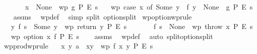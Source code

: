 \begin{isabellebody}
\ \ \ \ \ \ \ {\isachardoublequoteopen}x\ {\isacharequal}{\kern0pt}\ None\ {\isasymLongrightarrow}\ wp\ g\ P\ E\ s{\isachardoublequoteclose}\isanewline
\ \ \ {\isachardoublequoteopen}wp\ {\isacharparenleft}{\kern0pt}case\ x\ of\ Some\ y\ {\isasymRightarrow}\ f\ y\ {\isacharbar}{\kern0pt}\ None\ {\isasymRightarrow}\ g{\isacharparenright}{\kern0pt}\ P\ E\ s{\isachardoublequoteclose}\isanewline
%
\isadelimproof
\ \ %
\endisadelimproof
%
\isatagproof
{}\isamarkupfalse%
\ assms\ \isamarkupfalse%
\ wp{\isacharunderscore}{\kern0pt}def\ \isamarkupfalse%
\ {\isacharparenleft}{\kern0pt}simp\ split{\isacharcolon}{\kern0pt}\ option{\isachardot}{\kern0pt}split{\isacharparenright}{\kern0pt}%
\endisatagproof
{\isafoldproof}%
%
\isadelimproof
\isanewline
%
\endisadelimproof
\isanewline
{}\isamarkupfalse%
\ wpoption{\isacharbrackleft}{\kern0pt}wprule{\isacharbrackright}{\kern0pt}{\isacharcolon}{\kern0pt}\isanewline
\ \ \ {\isachardoublequoteopen}{\isasymAnd}y{\isachardot}{\kern0pt}\ f\ s\ {\isacharequal}{\kern0pt}\ Some\ y\ {\isasymLongrightarrow}\ wp\ {\isacharparenleft}{\kern0pt}return\ y{\isacharparenright}{\kern0pt}\ P\ E\ s{\isachardoublequoteclose}\isanewline
\ \ \ \ \ \ \ {\isachardoublequoteopen}f\ s\ {\isacharequal}{\kern0pt}\ None\ {\isasymLongrightarrow}\ wp\ {\isacharparenleft}{\kern0pt}throw\ x{\isacharparenright}{\kern0pt}\ P\ E\ s{\isachardoublequoteclose}\isanewline
\ \ \ {\isachardoublequoteopen}wp\ {\isacharparenleft}{\kern0pt}option\ x\ f{\isacharparenright}{\kern0pt}\ P\ E\ s{\isachardoublequoteclose}\isanewline
%
\isadelimproof
\ \ %
\endisadelimproof
%
\isatagproof
{}\isamarkupfalse%
\ assms\ \isamarkupfalse%
\ wp{\isacharunderscore}{\kern0pt}def\ \isamarkupfalse%
\ {\isacharparenleft}{\kern0pt}auto\ split{\isacharcolon}{\kern0pt}option{\isachardot}{\kern0pt}split{\isacharparenright}{\kern0pt}%
\endisatagproof
{\isafoldproof}%
%
\isadelimproof
\isanewline
%
\endisadelimproof
\isanewline
{}\isamarkupfalse%
\ wpprod{\isacharbrackleft}{\kern0pt}wprule{\isacharbrackright}{\kern0pt}{\isacharcolon}{\kern0pt}\isanewline
\ \ \ {\isachardoublequoteopen}{\isasymAnd}x\ y{\isachardot}{\kern0pt}\ a\ {\isacharequal}{\kern0pt}\ {\isacharparenleft}{\kern0pt}x{\isacharcomma}{\kern0pt}y{\isacharparenright}{\kern0pt}\ {\isasymLongrightarrow}\ wp\ {\isacharparenleft}{\kern0pt}f\ x\ y{\isacharparenright}{\kern0pt}\ P\ E\ s{\isachardoublequoteclose}\isanewline

\end{isabellebody}
